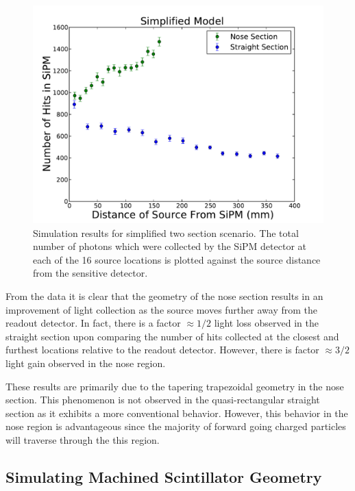 	\begin{figure}[!htb]
	\centering
	\includegraphics[width=1.0\columnwidth]{simulation/figs/sim_results_v4}
	\caption{Simulation results for simplified two section scenario. The total number of photons which were collected by the SiPM detector at each of the 16 source locations is plotted against the source distance from the sensitive detector.}
	\label{fig:sim_results}
	\end{figure}

From the data it is clear that the geometry of the nose section results in an improvement of light collection as the source moves further away from the readout detector.  In fact, there is a factor $\approx 1/2$ light loss observed in the straight section upon comparing the number of hits collected at the closest and furthest locations relative to the readout detector.  However, there is factor $\approx 3/2$ light gain observed in the nose region.

These results are primarily due to the tapering trapezoidal geometry in the nose section.  This phenomenon is not observed in the quasi-rectangular straight section as it exhibits a more conventional behavior. However, this behavior in the nose region is advantageous since the majority of forward going charged particles will traverse through the this region.

\subsection{Simulating Machined Scintillator Geometry} \label{sec:sim_mach}

